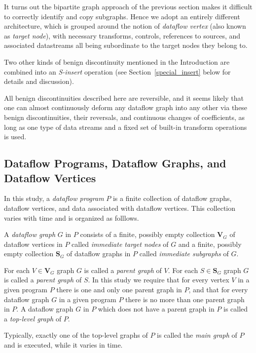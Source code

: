 \documentclass{llncs}
\begin{document}
It turns out the bipartite graph approach of the previous section makes it difficult
to correctly identify and copy subgraphs. Hence we adopt an entirely different
architecture, which is grouped around the notion of
{\em dataflow vertex} (also known as {\em target node}), with necessary transforms, controls, references
to sources, and associated datastreams all being subordinate to the target nodes
they belong to.

Two other kinds of benign discontinuity mentioned in the Introduction are combined
into an {\em S-insert} operation (see Section~\ref{special_insert} below for details
and discussion).

All benign discontinuities described here are reversible, and it seems likely that
one can almost continuously deform any dataflow graph into any other via
these benign discontinuities, their reversals, and continuous changes of
coefficients, as long as one type of data streams and a fixed set of built-in
transform operations is used.

\subsection{Dataflow Programs, Dataflow Graphs, and Dataflow Vertices}

In this study, a {\em dataflow program} $P$ is a finite collection of dataflow graphs, dataflow vertices, 
and data associated with dataflow vertices. This collection varies with time and is organized as folllows.

A {\em dataflow graph} $G$ in $P$ consists of a finite, possibly empty collection $\mathbf{V}_G$ of dataflow vertices in $P$ called {\em immediate target nodes} of
$G$ and a finite, possibly empty collection $\mathbf{S}_G$ of dataflow graphs in $P$ called {\em immediate subgraphs} of $G$.

For each $V \in \mathbf{V}_G$ graph $G$ is called a {\em parent graph} of $V$. For each $S \in \mathbf{S}_G$ graph $G$ is called a {\em parent graph} of $S$. 
In this study we require that for every vertex $V$ in a given program $P$ there is one and only one parent graph in $P$, and that for every
dataflow graph $G$ in a given program $P$ there is no more than one parent graph in $P$.  A dataflow graph $G$ in $P$ which does not
have a parent graph in $P$ is called a {\em top-level graph} of $P$.

Typically, exactly one of the top-level graphs of $P$ is called the {\em main graph} of $P$ and is executed, while it varies in time.
\end{document}
